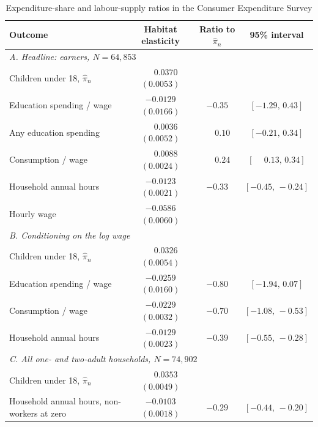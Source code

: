 \documentclass[11pt]{article}
\begin{document}
\begin{table}[h!]\centering
\begin{threeparttable}
\caption{Expenditure-share and labour-supply ratios in the Consumer Expenditure Survey}
\label{tab:cex}
\footnotesize\setlength{\tabcolsep}{4pt}
\begin{tabular}{lccc}
\toprule
Outcome & Habitat elasticity & Ratio to $\hat\pi_n$ & 95\% interval\\
\midrule
\multicolumn{4}{l}{\emph{A. Headline: earners, $N=64{,}853$}}\\
Children under 18, $\hat\pi_n$                    & $\phantom{-}0.0370$ $(0.0053)$ & & \\
Education spending / wage                         & $-0.0129$ $(0.0166)$ & $-0.35$ & $[-1.29,\,0.43]$\\
Any education spending                            & $\phantom{-}0.0036$ $(0.0052)$ & $\phantom{-}0.10$ & $[-0.21,\,0.34]$\\
Consumption / wage                                & $\phantom{-}0.0088$ $(0.0024)$ & $\phantom{-}0.24$ & $[\phantom{-}0.13,\,0.34]$\\
Household annual hours                            & $-0.0123$ $(0.0021)$ & $-0.33$ & $[-0.45,\,-0.24]$\\
Hourly wage                                       & $-0.0586$ $(0.0060)$ & & \\
\midrule
\multicolumn{4}{l}{\emph{B. Conditioning on the log wage}}\\
Children under 18, $\hat\pi_n$                    & $\phantom{-}0.0326$ $(0.0054)$ & & \\
Education spending / wage                         & $-0.0259$ $(0.0160)$ & $-0.80$ & $[-1.94,\,0.07]$\\
Consumption / wage                                & $-0.0229$ $(0.0032)$ & $-0.70$ & $[-1.08,\,-0.53]$\\
Household annual hours                            & $-0.0129$ $(0.0023)$ & $-0.39$ & $[-0.55,\,-0.28]$\\
\midrule
\multicolumn{4}{l}{\emph{C. All one- and two-adult households, $N=74{,}902$}}\\
Children under 18, $\hat\pi_n$                    & $\phantom{-}0.0353$ $(0.0049)$ & & \\
Household annual hours, non-workers at zero       & $-0.0103$ $(0.0018)$ & $-0.29$ & $[-0.44,\,-0.20]$\\
\bottomrule
\end{tabular}
\begin{tablenotes}\footnotesize

\end{tablenotes}
\end{threeparttable}
\end{table}
\end{document}
